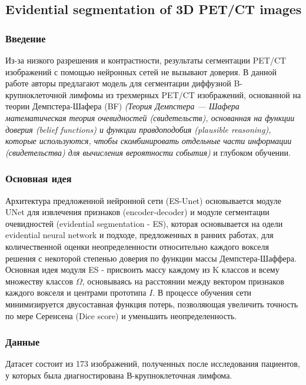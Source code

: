 \subsection*{Evidential segmentation of 3D PET/CT images}

\subsubsection*{Введение}
Из-за низкого разрешения и контрастности, результаты сегментации PET/CT изображений с помощью нейронных сетей не вызывают доверия. 
В данной работе авторы предлагают модель для сегментации диффузной B-крупноклеточной лимфомы из 
трехмерных PET/CT изображений, основанной на теории Демпстера-Шафера (BF) 
\textit{(Теория Демпстера — Шафера математическая теория очевидностей (свидетельств), 
основанная на функции доверия (belief functions) и функции правдоподобия (plausible reasoning), 
которые используются, чтобы скомбинировать отдельные части информации (свидетельства) для вычисления вероятности события)} и глубоком обучении. 
\subsubsection*{Основная идея}
\par
Архитектура предложенной нейронной сети (ES-Unet) \cite{ann4} основывается модуле UNet \cite{Unet}
для извлечения признаков (encoder-decoder) и модуле сегментации очевидностей 
(evidential segmentation - ES), которая основывается на одели evidential 
neural network и подходе, предложенных в ранних работах, для количественной 
оценки неопределенности относительно каждого вокселя решения с некоторой степенью 
доверия по функции массы Демпстера-Шаффера. Основная идея модуля ES - присвоить массу 
каждому из K классов и всему множеству классов \(\Omega\), основываясь на расстоянии между 
вектором признаков каждого вокселя и центрами прототипа \(I\). В процессе обучения сети 
минимизируется двусоставная функция потерь, позволяющая увеличить точность по мере Серенсена (Dice score) и уменьшить неопределенность.
\subsubsection*{Данные} 
\par
Датасет состоит из 173 изображений, полученных после исследования пациентов, у которых была диагностирована В-крупноклеточная лимфома.
